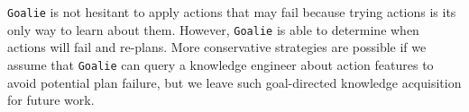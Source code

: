 \documentclass{article}
\def\goalie{{\tt Goalie}}
\begin{document}
\goalie{} is not hesitant to apply actions that may fail because trying actions is its only way to learn about them.  However, \goalie{} is able to determine when actions will fail and re-plans.  More conservative strategies are possible if we assume that \goalie{} can query a knowledge engineer about action features to avoid potential plan failure, but we leave such goal-directed knowledge acquisition for future work.




%


%
%
\end{document}
